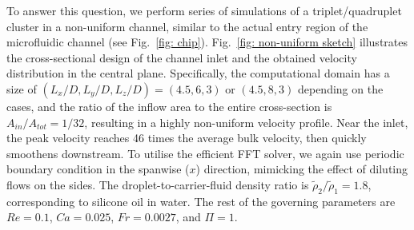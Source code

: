 To answer this question, we perform series of simulations of a triplet/quadruplet cluster in a non-uniform channel, similar to the actual entry region of the microfluidic channel (see Fig.\ \ref{fig: chip}). Fig.\ \ref{fig: non-uniform sketch} illustrates the cross-sectional design of the channel inlet and the obtained velocity distribution in the central plane. Specifically, the computational domain has a size of $(L_x/D,L_y/D,L_z/D)=(4.5,6,3)$ or $(4.5,8,3)$ depending on the cases, and the ratio of the inflow area to the entire cross-section is $A_{in}/A_{tot}=1/32$, resulting in a highly non-uniform velocity profile. Near the inlet, the peak velocity reaches 46 times the average bulk velocity, then quickly smoothens downstream. To utilise the efficient FFT solver, we again use periodic boundary condition in the spanwise ($x$) direction, mimicking the effect of diluting flows on the sides. The droplet-to-carrier-fluid density ratio is $\tilde{\rho}_2/\tilde{\rho}_1=1.8$, corresponding to silicone oil in water. The rest of the governing parameters are $Re=0.1$, $Ca=0.025$, $Fr=0.0027$, and $\Pi=1$.

